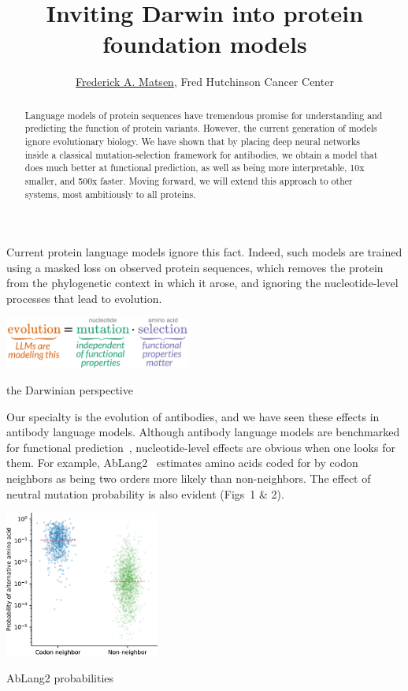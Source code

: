 \documentclass[nobib]{tufte-handout}
\title{Inviting Darwin into protein foundation models}
\author{\href{http://matsen.fredhutch.org/}{Frederick A. Matsen}, Fred Hutchinson Cancer Center}
\begin{document}
\maketitle

\begin{abstract}
\noindent
Language models of protein sequences have tremendous promise for understanding and predicting the function of protein variants.
However, the current generation of models ignore evolutionary biology.
We have shown that by placing deep neural networks inside a classical mutation-selection framework for antibodies, we obtain a model that does much better at functional prediction, as well as being more interpretable, 10x smaller, and 500x faster.
Moving forward, we will extend this approach to other systems, most ambitiously to all proteins.
\end{abstract}

Current protein language models ignore this fact.
Indeed, such models are trained using a masked loss on observed protein sequences, which removes the protein from the phylogenetic context in which it arose, and ignoring the nucleotide-level processes that lead to evolution.

\begin{marginfigure}[-9.9cm]%
  \hspace{-19pt}
  \includegraphics[width=2.4in]{figures/evolution-is-mut-and-sel.why.pdf}%
  \caption{the Darwinian perspective}
\end{marginfigure}

Our specialty is the evolution of antibodies, and we have seen these effects in antibody language models.
Although antibody language models are benchmarked for functional prediction~\cite{Chungyoun2024-fc}, nucleotide-level effects are obvious when one looks for them.
For example, AbLang2~\cite{Olsen2024-ablang2} estimates amino acids coded for by codon neighbors as being two orders more likely than non-neighbors.
The effect of neutral mutation probability is also evident (Figs~1 \& 2).

\begin{marginfigure}[-7.8cm]%
  \hspace{-19pt}
  \includegraphics[width=2.0in]{figures/ablang2-neighbor-csp.pdf}%
  \caption{AbLang2 probabilities}
\end{marginfigure}
\end{document}
